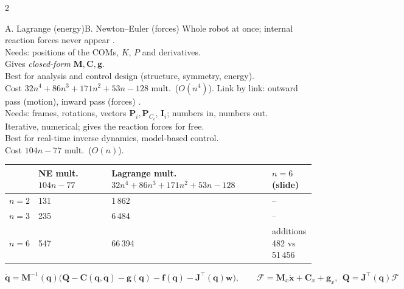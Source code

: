 \begin{multicols}{2}
\label{w7:twoway}
\begin{twoway}{A. Lagrange (energy)}{B. Newton--Euler (forces)}
Whole robot at once; internal reaction forces never appear .\\
Needs: positions of the COMs, $K$, $P$ and derivatives.\\
Gives \emph{closed-form} $\mathbf M,\mathbf C,\mathbf g$.\\
Best for analysis and control design (structure, symmetry, energy).\\
Cost $32n^4+86n^3+171n^2+53n-128$ mult.\ ($O(n^4)$).
\tcblower
Link by link: outward pass (motion), inward pass (forces) .\\
Needs: frames, rotations, vectors $\mathbf P_i,\mathbf P_{C_i}$, $\mathbf I_i$; numbers in, numbers out.\\
Iterative, numerical; gives the reaction forces for free.\\
Best for real-time inverse dynamics, model-based control.\\
Cost $104n-77$ mult.\ ($O(n)$).
\end{twoway}
\begin{fbx}
\begin{tabularx}{\linewidth}{@{}lXXX@{}}\toprule & NE mult.\ $104n-77$ & Lagrange mult.\ $32n^4+86n^3+171n^2+53n-128$ & $n=6$ (slide)\\\midrule
$n=2$ & 131 & 1\,862 & --\\
$n=3$ & 235 & 6\,484 & --\\
$n=6$ & 547 & 66\,394 & additions 482 vs 51\,456\\\bottomrule\end{tabularx}
\end{fbx}
\begin{fbx}
\[\ddot{\mathbf q}=\mathbf M^{-1}(\mathbf q)\big(\mathbf Q-\mathbf C(\mathbf q,\dot{\mathbf q})-\mathbf g(\mathbf q)-\mathbf f(\dot{\mathbf q})-\mathbf J^\top(\mathbf q)\mathbf w\big),\qquad \boldsymbol{\mathcal F}=\mathbf M_x\ddot{\mathbf x}+\mathbf C_x+\mathbf g_x,\ \ \mathbf Q=\mathbf J^\top(\mathbf q)\boldsymbol{\mathcal F}\]
\end{fbx}


\end{multicols}
